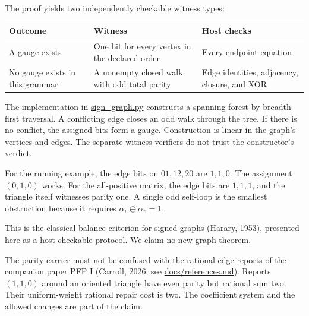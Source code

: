 \documentclass[
  11pt,
]{article}
\begin{document}
The proof yields two independently checkable witness types:

\begin{longtable}[]{@{}
  >{\raggedright\arraybackslash}p{}
  >{\raggedright\arraybackslash}p{}
  >{\raggedright\arraybackslash}p{}@{}}
\toprule\noalign{}
\begin{minipage}[b]{\linewidth}\raggedright
Outcome
\end{minipage} & \begin{minipage}[b]{\linewidth}\raggedright
Witness
\end{minipage} & \begin{minipage}[b]{\linewidth}\raggedright
Host checks
\end{minipage} \\
\midrule\noalign{}
\endhead
\bottomrule\noalign{}
\endlastfoot
A gauge exists & One bit for every vertex in the declared order & Every
endpoint equation \\
No gauge exists in this grammar & A nonempty closed walk with odd total
parity & Edge identities, adjacency, closure, and XOR \\
\end{longtable}

The implementation in
\href{https://github.com/dbccpage/the_symbol_game/blob/c819bec432446dd3c9b1edf1583384cfe76c6c71/atlas/coda_atlas/symbol_game/002_pfp_signed_presentations_and_search_frontier/code/genesis_alpha/sign_graph.py}{sign\_graph.py}
constructs a spanning forest by breadth-first traversal. A conflicting
edge closes an odd walk through the tree. If there is no conflict, the
assigned bits form a gauge. Construction is linear in the graph's
vertices and edges. The separate witness verifiers do not trust the
constructor's verdict.

For the running example, the edge bits on \(01,12,20\) are \(1,1,0\).
The assignment \((0,1,0)\) works. For the all-positive matrix, the edge
bits are \(1,1,1\), and the triangle itself witnesses parity one. A
single odd self-loop is the smallest obstruction because it requires
\(\alpha_v\oplus\alpha_v=1\).

This is the classical balance criterion for signed graphs (Harary,
1953), presented here as a host-checkable protocol. We claim no new
graph theorem.

The parity carrier must not be confused with the rational edge reports
of the companion paper PFP I (Carroll, 2026; see
\href{https://github.com/dbccpage/the_symbol_game/blob/c819bec432446dd3c9b1edf1583384cfe76c6c71/atlas/coda_atlas/symbol_game/002_pfp_signed_presentations_and_search_frontier/docs/references.md}{docs/references.md}).
Reports \((1,1,0)\) around an oriented triangle have even parity but
rational sum two. Their uniform-weight rational repair cost is two. The
coefficient system and the allowed changes are part of the claim.
\end{document}
